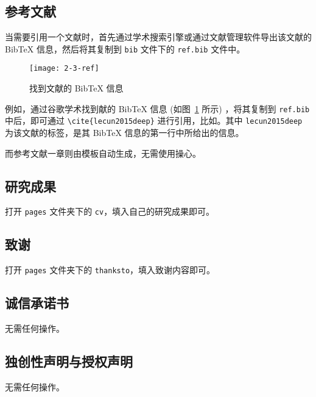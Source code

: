 \subsection{参考文献}

当需要引用一个文献时，首先通过学术搜索引擎或通过文献管理软件导出该文献的 BibTeX 信息，然后将其复制到 \texttt{bib} 文件下的 \texttt{ref.bib} 文件中。

\begin{figure}[H]
    \centering
    \texttt{[image: 2-3-ref]}
    \caption{\label{fig:ref} 找到文献的 BibTeX 信息}
\end{figure}

例如，通过谷歌学术找到献的 BibTeX 信息 (如图~\ref{fig:ref} 所示) ，将其复制到 \texttt{ref.bib} 中后，即可通过 \verb|\cite{lecun2015deep}| 进行引用，比如\cite{lecun2015deep}。其中 \texttt{lecun2015deep} 为该文献的标签，是其 BibTeX 信息的第一行中所给出的信息。

而参考文献一章则由模板自动生成，无需使用操心。

\subsection{研究成果}

打开 \texttt{pages} 文件夹下的 \texttt{cv}，填入自己的研究成果即可。

\subsection{致谢}

打开 \texttt{pages} 文件夹下的 \texttt{thanksto}，填入致谢内容即可。

\subsection{诚信承诺书}

无需任何操作。

\subsection{独创性声明与授权声明}

无需任何操作。
